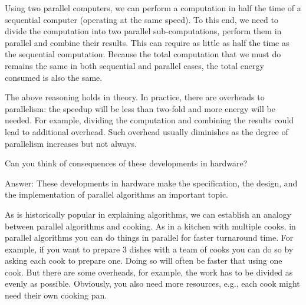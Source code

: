 \begin{cluster}
\label{grp:xmpl:introduction::parallelism::using}

\begin{example}
\label{xmpl:introduction::parallelism::using}
Using two parallel computers, we can perform a computation in half the
time of a sequential computer (operating at the same speed).
To this end, we need to divide the computation into two parallel
sub-computations, perform them in parallel and combine their results.
This can require as little as half the time as the sequential
computation.
Because the total computation that we must do remains the same in both
sequential and parallel cases, the total energy consumed is also the same.

The above reasoning holds in theory.
In practice, there are overheads to parallelism: the speedup will be
less than two-fold and more energy will be needed.
For example, dividing the computation and combining the results could
lead to additional overhead.  
Such overhead usually diminishes as the degree of parallelism
increases but not always.

\end{example}
\end{cluster}

\begin{cluster}
\label{grp:tch:introduction::parallelism::think}

\begin{teachask}
\label{tch:introduction::parallelism::think}
Can you think of consequences of these developments in hardware?  

Answer:
These developments in hardware make the specification, the design, and
the implementation of parallel algorithms an important topic.

\end{teachask}
\end{cluster}

\begin{cluster}
\label{grp:xmpl:introduction::parallelism::historically}

\begin{example}
\label{xmpl:introduction::parallelism::historically}
As is historically popular in explaining algorithms, we can establish
an analogy between parallel algorithms and cooking.  As in a kitchen
with multiple cooks, in parallel algorithms you can do things in
parallel for faster turnaround time.  For example, if you want to
prepare 3 dishes with a team of cooks you can do so by asking each
cook to prepare one.
Doing so will often be faster that using one cook.  But there are some
overheads, for example, the work has to be divided as evenly as
possible.  Obviously, you also need more resources, e.g., each cook
might need their own cooking pan.

\end{example}
\end{cluster}


